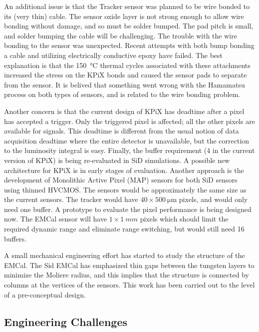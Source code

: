 An additional issue is that the Tracker sensor was planned to be wire bonded to its (very thin) cable. The sensor oxide layer is not strong enough to allow wire bonding without damage, and so must be solder bumped. The pad pitch is small, and solder bumping the cable will be challenging. The trouble with the wire bonding to the sensor was unexpected. Recent attempts with both bump bonding a cable and utilizing electrically conductive epoxy have failed. The best explanation is that the \SI{150}{\degreeCelsius} thermal cycles associated with these attachments increased the stress on the KPiX bonds and caused the sensor pads to separate from the sensor. It is belived that something went wrong with the Hamamatsu process on both types of sensors, and is related to the wire bonding problem.

Another concern is that the current design of KPiX has deadtime after a pixel has accepted a trigger. Only the triggered pixel is affected; all the other pixels are available for signals. This deadtime is different from the usual notion of data acquisition deadtime where the entire detector is unavailable, but the correction to the luminosity integral is easy. Finally, the buffer requirement (4 in the current version of KPiX) is being re-evaluated in SiD simulations. A possible new architecture for KPiX is in early stages of evaluation. Another approach is the development of Monolithic Active Pixel (MAP) sensors for both SiD sensors using thinned HVCMOS. The sensors would be approximately the same size as the current sensors. The tracker would have $40 \times \SI{500}{\micro\meter}$ pixels, and would only need one buffer. A prototype to evaluate the pixel performance is being designed now. The EMCal sensor will have $1 \times \SI{1}{mm}$ pixels which should limit the required dynamic range and eliminate range switching, but would still need 16 buffers.

A small mechanical engineering effort has started to study the structure of the EMCal. The Sid EMCal has emphasized thin gaps between the tungsten layers to minimize the Moliere radius, and this implies that the structure is connected by columns at the vertices of the sensors. This work has been carried out to the level of a pre-conceptual design.

\subsection{Engineering Challenges}
